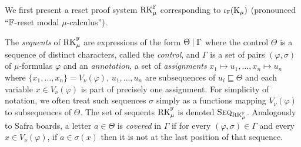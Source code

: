We first present a reset proof system $\mathrm{RK}_\mu^{\mathbb{F}}$ corresponding to
$\iota_{\mathbb{F}}(\mathrm{K}_\mu)$ (pronounced ``$\mathbb{F}$-reset modal
$\mu$-calculus'').

The \emph{sequents} of $\mathrm{RK}_\mu^{\mathbb{F}}$ are expressions of the form $\Theta
\mid \Gamma$ where the control $\Theta$ is a sequence of distinct characters,
called the \emph{control},
and $\Gamma$ is a set of pairs $(\varphi, \sigma)$ of $\mu$-formulas $\varphi$
and an \emph{annotation}, a set of \emph{assignments} $x_1 \mapsto u_1, \ldots, x_n \mapsto u_n$ where $\{x_1,
\ldots, x_n\} = V_\nu(\varphi)$, $u_1, \ldots, u_n$ are subsequences of
$u_i \sqsubseteq \Theta$ and each variable $x \in V_\nu(\varphi)$ is part of
precisely one assignment. For simplicity of notation, we often treat such
sequences $\sigma$ simply as a functions mapping $V_\nu(\varphi)$ to
subsequences of $\Theta$. The set of sequents $\mathrm{RK}_\mu^{\mathbb{F}}$ is denoted
$\textsc{Seq}_{\mathrm{RK}_\mu^{\mathbb{F}}}$.
Analogously to Safra boards, a letter $a \in \Theta$ is \emph{covered} in $\Gamma$ if for every
$(\varphi, \sigma) \in \Gamma$ and every $x \in V_\nu(\varphi)$, if $a \in
\sigma(x)$ then it is not at the last position of that sequence.

